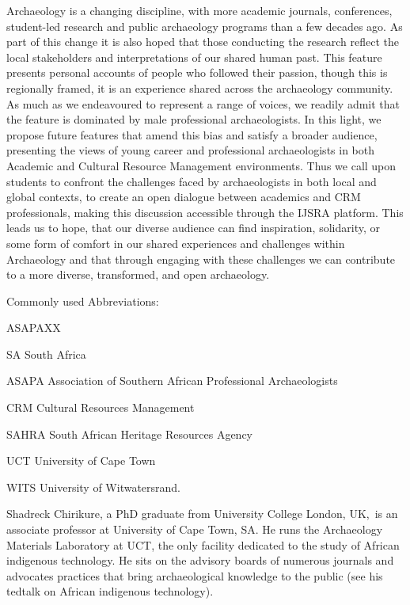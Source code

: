 Archaeology is a changing discipline, with more academic journals, conferences, student-led research and public archaeology programs than a few decades ago. As part of this change it is also hoped that those conducting the research reflect the local stakeholders and interpretations of our shared human past. This feature presents personal accounts of people who followed their passion, though this is regionally framed, it is an experience shared across the archaeology community. As much as we endeavoured to represent a range of voices, we readily admit that the feature is dominated by male professional archaeologists. In this light, we propose future features that amend this bias and satisfy a broader audience, presenting the views of young career and professional archaeologists in both Academic and Cultural Resource Management environments. Thus we call upon students to confront the challenges faced by archaeologists in both local and global contexts, to create an open dialogue between academics and CRM professionals, making this discussion accessible through the IJSRA platform. This leads us to hope, that our diverse audience can find inspiration, solidarity, or some form of comfort in our shared experiences and challenges within Archaeology and that through engaging with these challenges we can contribute to a more diverse, transformed, and open archaeology.

\bigskip
{}
Commonly used Abbreviations:
\begin{labeling}{ASAPAXX}	
\item[SA] South Africa 
\item[ASAPA] Association of Southern African Professional Archaeologists
\item[CRM] Cultural Resources Management
\item[SAHRA] South African Heritage Resources Agency
\item[UCT] University of Cape Town 
\item[WITS] University of Witwatersrand.
\end{labeling}

\IJSRAseparator
{}
{\sffamily Shadreck Chirikure, a PhD graduate from University College London, UK, is an associate professor at University of Cape Town, SA. He runs the Archaeology Materials Laboratory at UCT, the only facility dedicated to the study of African indigenous technology. He sits on the advisory boards of numerous journals and advocates practices that bring archaeological knowledge to the public (see his tedtalk on African indigenous technology).}

